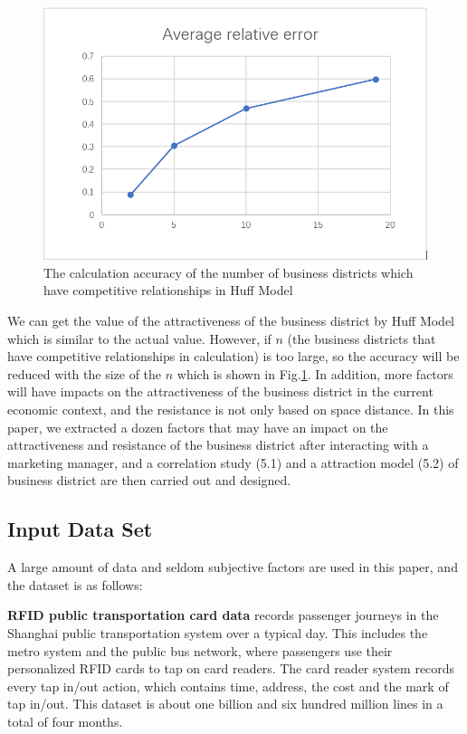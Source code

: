\documentclass[journal]{IEEEtran}
\begin{document}
\begin{figure}[tb]
\centering
\includegraphics[width=1\columnwidth]{figure2.png}
\caption{The calculation accuracy of the number of business districts which have competitive relationships in Huff Model}
\label{fig:Huff-accuracy}
\end{figure}

We can get the value of the attractiveness of the business district by Huff Model which is similar to the actual value. However, if $n$ (the business districts that have competitive relationships in calculation) is too large, so the accuracy will be reduced with the size of the $n$ which is shown in Fig.\ref{fig:Huff-accuracy}. In addition, more factors will have impacts on the attractiveness of the business district in the current economic context, and the resistance is not only based on space distance. In this paper, we extracted a dozen factors that may have an impact on the attractiveness and resistance of the business district after interacting with a marketing manager, and a correlation study (5.1) and a attraction model (5.2) of business district are then carried out and designed.

\subsection{Input Data Set}
A large amount of data and seldom subjective factors are used in this paper, and the dataset is as follows:


\textbf{RFID public transportation card data} records passenger journeys in the Shanghai public transportation system over a typical day. This includes the metro system and the public bus network, where passengers use their personalized RFID cards to tap on card readers. The card reader system records every tap in/out action, which contains time, address, the cost and the mark of tap in/out. This dataset is about one billion and six hundred million lines in a total of four months.
\end{document}
